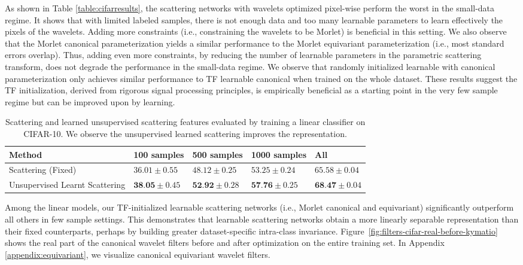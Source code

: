 \documentclass[10pt,twocolumn,letterpaper]{article}
\begin{document}
As shown in Table \ref{table:cifarresults}, the scattering networks with wavelets optimized pixel-wise perform the worst in the small-data regime. It shows that with limited labeled samples, there is not enough data and too many learnable parameters to learn effectively the pixels of the wavelets. Adding more constraints (i.e., constraining the wavelets to be Morlet) is beneficial in this setting.  We also observe that the Morlet canonical parameterization yields a similar performance to the Morlet equivariant parameterization (i.e., most standard errors overlap). Thus, adding even more constraints, by reducing the number of learnable parameters in the parametric scattering transform, does not degrade the performance in the small-data regime. We observe that randomly initialized learnable with canonical parameterization only achieves similar performance to TF learnable canonical when trained on the whole dataset. These results suggest the TF initialization, derived from rigorous signal processing principles, is empirically beneficial as a starting point in the very few sample regime but can be improved upon by learning.
\begin{table*}
    \caption{Scattering and learned unsupervised scattering features evaluated by training a linear classifier on CIFAR-10. We observe the unsupervised learned scattering improves the representation.\vspace{-10pt}}
    \centering
    \small
    \label{table:unsup}
      \fontsize{8}{8.5}\selectfont 
    \begin{tabular}{lllll}
             \hline
          Method &100 samples & 500 samples & 1000 samples  & All\\
            \hline
           Scattering (Fixed) & $36.01\pm0.55$ & $48.12\pm0.25$ &$53.25\pm 0.24$&$65.58\pm0.04$ \\ 
           Unsupervised Learnt Scattering &$\textbf{38.05} \pm 0.45 $ & $ 	\textbf{52.92} \pm 0.28	$ &$\textbf{57.76} \pm 0.25 $&$ \textbf{68.47} \pm 0.04$ \\ 
            \hline
\end{tabular}
\vspace{-8pt}
\end{table*}
Among the linear models, our TF-initialized learnable scattering networks (i.e., Morlet canonical and equivariant) significantly outperform all others in few sample settings. This demonstrates that learnable scattering networks obtain a more linearly separable representation than their fixed counterparts, perhaps by building greater dataset-specific intra-class invariance. 
Figure~\ref{fig:filters-cifar-real-before-kymatio} shows the real part of the canonical wavelet filters before and after optimization on the entire training set. In Appendix \ref{appendix:equivariant}, we visualize canonical equivariant wavelet filters. 
\end{document}
